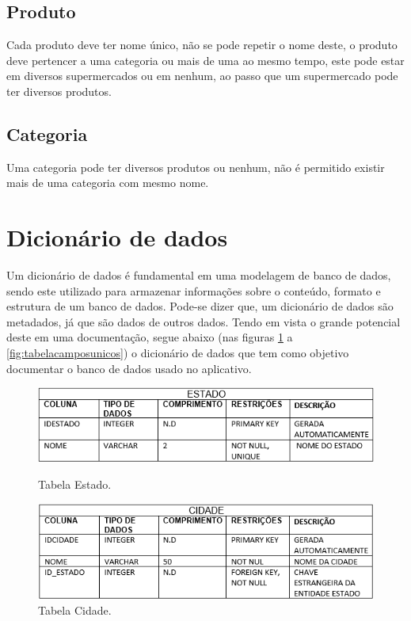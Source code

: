 \subsection{Produto}
	Cada produto deve ter nome único, não se pode repetir o nome deste, o produto deve pertencer a uma categoria ou mais de uma ao mesmo tempo, este pode estar em diversos supermercados ou em nenhum, ao passo que um supermercado pode ter diversos produtos. 

\subsection{Categoria}
	Uma categoria pode ter diversos produtos ou nenhum, não é permitido existir mais de uma categoria com mesmo nome.
	
\section{Dicionário de dados}
	Um dicionário de dados é fundamental em uma modelagem de banco de dados, sendo este utilizado para armazenar informações sobre o conteúdo, formato e estrutura de um banco de dados. Pode-se dizer que, um dicionário de dados são metadados, já que são dados de outros dados. Tendo em vista o grande potencial deste em uma documentação, segue abaixo (nas figuras \ref{fig:tabelaestado} a \ref{fig:tabelacamposunicos}) o dicionário de dados que tem como objetivo documentar o banco de dados usado no aplicativo.
	
\begin{figure}[H]
	\centering
	\caption{Tabela Estado.}
	\includegraphics[scale=0.64]{Imagens/TabelaEstado.PNG}
    \label{fig:tabelaestado}
\end{figure}
						
\begin{figure}[H]
	\centering
    \caption{Tabela Cidade.}
    \includegraphics[scale=0.64]{Imagens/TabelaCidade.PNG}
\end{figure}
			
